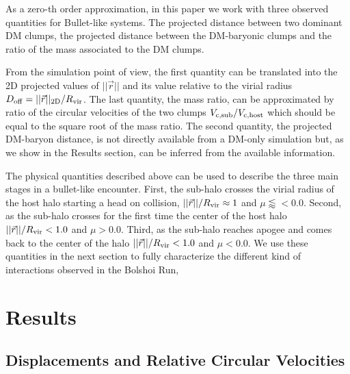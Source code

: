 \documentclass{emulateapj}
\begin{document}
As a zero-th order approximation, in this paper we work with three
observed quantities for Bullet-like systems. The projected distance
between two dominant DM clumps, the projected distance between the
DM-baryonic clumps and the ratio of the mass associated to the DM
clumps.

From the simulation point of view, the first quantity can be
translated into the 2D projected values of $||\vec{r}||$ and its value
relative to the virial radius $D_{\rm   off}= ||\vec{r}||_{\rm
  2D}/R_{\rm vir}$. The last quantity, the mass ratio, can be
approximated by ratio of the circular velocities of the two clumps $V_{\rm c,sub}/V_{\rm  c,host}$ which should be equal to the square root of the mass
ratio. The second quantity, the projected DM-baryon distance, is not
directly available from a DM-only simulation but, as we show in the
Results section, can be inferred from the available information.  
 
The physical quantities described above can be used to describe
the three main stages in a bullet-like encounter. First, the sub-halo
crosses the virial radius of the host halo starting a head on
collision, $||\vec{r}||/R_{\rm vir}\approx 1$ and
$\mu\lessapprox<0.0$. Second, as the sub-halo crosses for the first time
the center of the host halo $||\vec{r}||/R_{\rm vir} < 1.0$ and
$\mu>0.0$. Third, as the sub-halo reaches apogee and comes back to the
center of the halo $||\vec{r}||/R_{\rm vir} < 1.0$ and $\mu<0.0$. We use
these quantities in the next section to fully characterize the different
kind of interactions observed in the Bolshoi Run,


\section{Results}
\label{sec:results}

\subsection{Displacements and Relative Circular Velocities}
\label{fig:displacement}
\end{document}
